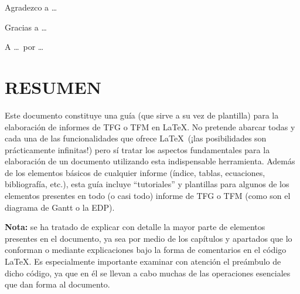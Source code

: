 \documentclass[a4paper, 11pt, spanish, twoside]{article}
\begin{document}
Agradezco a \dots

Gracias a \dots

A \dots \ por \dots

\afterpage{\blankpage} %




\newpage
\section*{RESUMEN} %

Este documento constituye una guía (que sirve a su vez de plantilla) para la elaboración de informes de TFG o TFM en \LaTeX. No pretende abarcar todas y cada una de las funcionalidades que ofrece \LaTeX \ (¡las posibilidades son prácticamente infinitas!) pero sí tratar los aspectos fundamentales para la elaboración de un documento utilizando esta indispensable herramienta. Además de los elementos básicos de cualquier informe (índice, tablas, ecuaciones, bibliografía, etc.), esta guía incluye ``tutoriales'' y plantillas para algunos de los elementos presentes en todo (o casi todo) informe de TFG o TFM (como son el diagrama de Gantt o la EDP). 

\textbf{Nota:} se ha tratado de explicar con detalle la mayor parte de elementos presentes en el documento, ya sea por medio de los capítulos y apartados que lo conforman o mediante explicaciones bajo la forma de comentarios en el código \LaTeX. Es especialmente importante examinar con atención el preámbulo de dicho código, ya que en él se llevan a cabo muchas de las operaciones esenciales que dan forma al documento.
\end{document}
